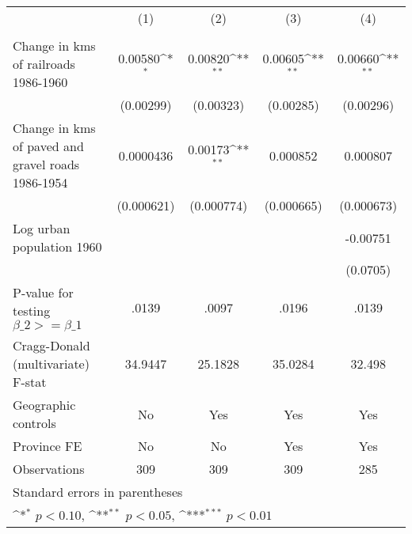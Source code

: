 {
\def\sym#1{\ifmmode^{#1}\else\(^{#1}\)\fi}
\begin{tabular}{l*{4}{c}}
\hline\hline
                &\multicolumn{1}{c}{(1)}&\multicolumn{1}{c}{(2)}&\multicolumn{1}{c}{(3)}&\multicolumn{1}{c}{(4)}\\
                &\multicolumn{1}{c}{}&\multicolumn{1}{c}{}&\multicolumn{1}{c}{}&\multicolumn{1}{c}{}\\
\hline
Change in kms of railroads 1986-1960&  0.00580\sym{*}  &  0.00820\sym{**} &  0.00605\sym{**} &  0.00660\sym{**} \\
                &(0.00299)         &(0.00323)         &(0.00285)         &(0.00296)         \\
[1em]
Change in kms of paved and gravel roads 1986-1954&0.0000436         &  0.00173\sym{**} & 0.000852         & 0.000807         \\
                &(0.000621)         &(0.000774)         &(0.000665)         &(0.000673)         \\
[1em]
Log urban population 1960&                  &                  &                  & -0.00751         \\
                &                  &                  &                  & (0.0705)         \\
\hline
P-value for testing $\beta\_{2} >= \beta\_{1}$&    .0139         &    .0097         &    .0196         &    .0139         \\
Cragg-Donald (multivariate) F-stat&  34.9447         &  25.1828         &  35.0284         &   32.498         \\
Geographic controls&       No         &      Yes         &      Yes         &      Yes         \\
Province FE     &       No         &       No         &      Yes         &      Yes         \\
Observations    &      309         &      309         &      309         &      285         \\
\hline\hline
\multicolumn{5}{l}{\footnotesize Standard errors in parentheses}\\
\multicolumn{5}{l}{\footnotesize \sym{*} \(p<0.10\), \sym{**} \(p<0.05\), \sym{***} \(p<0.01\)}\\
\end{tabular}
}

